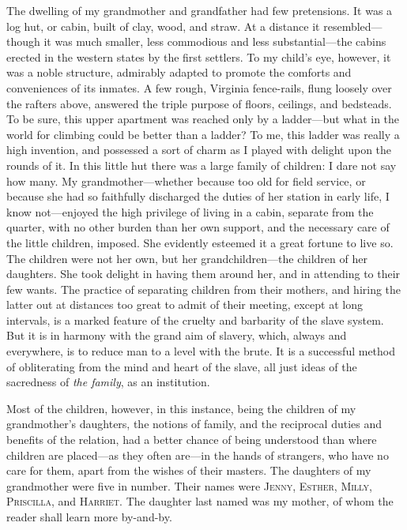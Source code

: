 The dwelling of my grandmother and grandfather had few pretensions. It
was a log hut, or cabin, {}built of clay, wood, and straw. At a distance
it resembled---though it was much smaller, less commodious and less
substantial---the cabins erected in the western states by the first
settlers. To my child's eye, however, it was a noble structure,
admirably adapted to promote the comforts and conveniences of its
inmates. A few rough, Virginia fence-rails, flung loosely over the
rafters above, answered the triple purpose of floors, ceilings, and
bedsteads. To be sure, this upper apartment was reached only by a
ladder---but what in the world for climbing could be better than a
ladder? To me, this ladder was really a high invention, and possessed a
sort of charm as I played with delight upon the rounds of it. In this
little hut there was a large family of children: I dare not say how
many. My grandmother---whether because too old for field service, or
because she had so faithfully discharged the duties of her station in
early life, I know not---enjoyed the high privilege of living in a
cabin, separate from the quarter, with no other burden than her own
support, and the necessary care of the little children, imposed. She
evidently esteemed it a great fortune to live so. The children were not
her own, but her grandchildren---the children of her daughters. She took
delight in having them around her, and in attending to their few wants.
The practice of separating children from their mothers, and hiring the
latter out at distances too great to admit of their meeting, except at
long intervals, is a marked feature of the cruelty and barbarity of the
slave system. But it is in harmony with the grand aim of slavery, which,
always and everywhere, is to {}reduce man to a level with the brute. It
is a successful method of obliterating from the mind and heart of the
slave, all just ideas of the sacredness of \emph{the family}, as an
institution.

Most of the children, however, in this instance, being the children of
my grandmother's daughters, the notions of family, and the reciprocal
duties and benefits of the relation, had a better chance of being
understood than where children are placed---as they often are---in the
hands of strangers, who have no care for them, apart from the wishes of
their masters. The daughters of my grandmother were five in number.
Their names were \textsc{Jenny, Esther, Milly, Priscilla}, and
\textsc{Harriet}. The daughter last named was my mother, of whom the
reader shall learn more by-and-by.

